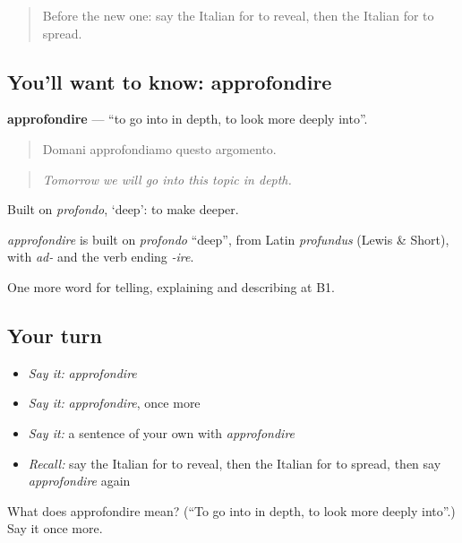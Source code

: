 \label{lesson:IT-C288-approfondire}



\begin{quote}
Before the new one: say the Italian for to reveal, then the Italian for to spread.
\end{quote}

\subsection*{You'll want to know: approfondire}
\textbf{approfondire} — \textquotedblleft{}to go into in depth, to look more deeply into\textquotedblright{}.

\begin{quote}
Domani approfondiamo questo argomento.
\end{quote}

\begin{quote}
\emph{Tomorrow we will go into this topic in depth.}
\end{quote}

Built on \emph{profondo}, ‘deep’: to make deeper.

\begin{cousinweb}
\emph{approfondire} is built on \emph{profondo} \textquotedblleft{}deep\textquotedblright{}, from Latin \emph{profundus} (Lewis \& Short), with \emph{ad-} and the verb ending \emph{-ire}.
\end{cousinweb}

\begin{grammarlens}[title={What you've built}]
One more word for telling, explaining and describing at B1.
\end{grammarlens}

\subsection*{Your turn}
\begin{itemize}
\raggedright
  \item \emph{Say it:} \emph{approfondire}
  \item \emph{Say it:} \emph{approfondire}, once more
  \item \emph{Say it:} a sentence of your own with \emph{approfondire}
  \item \emph{Recall:} say the Italian for to reveal, then the Italian for to spread, then say \emph{approfondire} again
\end{itemize}

\begin{tcolorbox}[breakable,colback=teal!4,colframe=teal!35!black,title={Before you move on}]
What does approfondire mean? (\textquotedblleft{}To go into in depth, to look more deeply into\textquotedblright{}.) Say it once more.
\end{tcolorbox}
